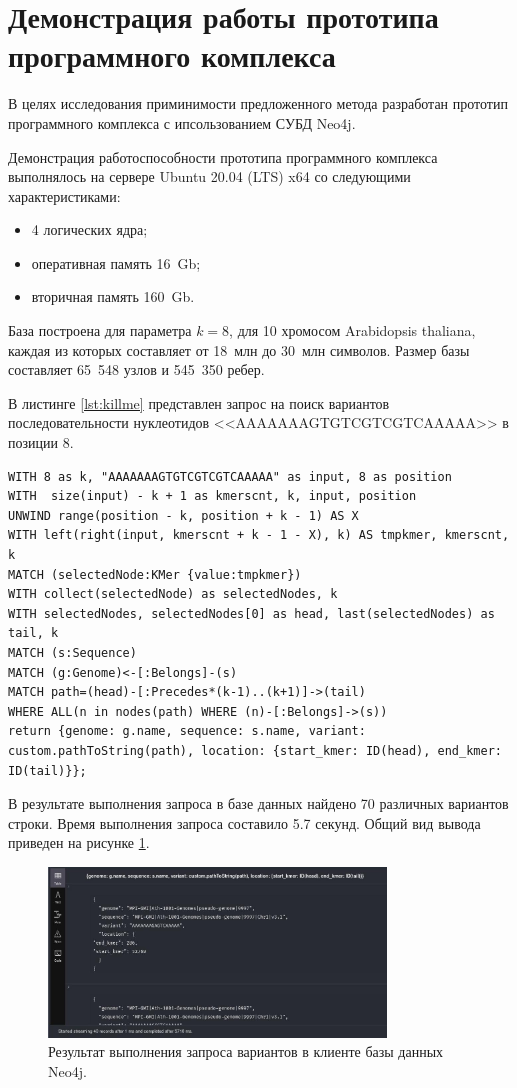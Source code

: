 \section{Демонстрация работы прототипа программного комплекса}

В целях исследования приминимости предложенного метода разработан прототип программного комплекса с ипсользованием СУБД Neo4j.

Демонстрация работоспособности прототипа программного комплекса выполнялось на сервере Ubuntu 20.04 (LTS) x64 со следующими характеристиками: 
\begin{itemize}
	\item 4 логических ядра;
	\item оперативная память 16~Gb;
	\item вторичная память 160~Gb.
\end{itemize}

База построена для параметра $k=8$, для 10 хромосом Arabidopsis thaliana, каждая из которых составляет от 18~млн до 30~млн символов. Размер базы составляет 65~548 узлов и 545~350 ребер.

В листинге \ref{lst:killme} представлен запрос на поиск вариантов последовательности нуклеотидов <<AAAAAAAGTGTCGTCGTCAAAAA>> в позиции $8$.

\begin{lstlisting}[label={lst:killme}, caption={Запрос на поиск вариантов последовательности нуклеотидов в заданной позиции.}]
WITH 8 as k, "AAAAAAAGTGTCGTCGTCAAAAA" as input, 8 as position
WITH  size(input) - k + 1 as kmerscnt, k, input, position
UNWIND range(position - k, position + k - 1) AS X
WITH left(right(input, kmerscnt + k - 1 - X), k) AS tmpkmer, kmerscnt, k
MATCH (selectedNode:KMer {value:tmpkmer})
WITH collect(selectedNode) as selectedNodes, k
WITH selectedNodes, selectedNodes[0] as head, last(selectedNodes) as tail, k
MATCH (s:Sequence)
MATCH (g:Genome)<-[:Belongs]-(s)
MATCH path=(head)-[:Precedes*(k-1)..(k+1)]->(tail) 
WHERE ALL(n in nodes(path) WHERE (n)-[:Belongs]->(s))
return {genome: g.name, sequence: s.name, variant: custom.pathToString(path), location: {start_kmer: ID(head), end_kmer: ID(tail)}};
\end{lstlisting}

В результате выполнения запроса в базе данных найдено 70 различных вариантов строки. Время выполнения запроса составило 5.7 секунд. Общий вид вывода приведен на рисунке \ref{fig:killme}.

\begin{figure}[!th]
	\centering
	\includegraphics[width=0.8\textwidth]{img/killme.jpg}
	\caption{Результат выполнения запроса вариантов в клиенте базы данных Neo4j.}
	\label{fig:killme}
\end{figure}

\pagebreak